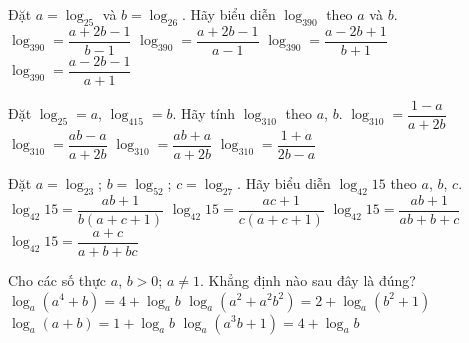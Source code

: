 \begin{ex}%
	Đặt $a=\log_25$ và $b=\log_26$. Hãy biểu diễn $\log_390$ theo $a$ và $b$.
	\choice
	{\True $\log_390=\dfrac{a+2b-1}{b-1}$}
	{$\log_390=\dfrac{a+2b-1}{a-1}$}
	{$\log_390=\dfrac{a-2b+1}{b+1}$}
	{$\log_390=\dfrac{a-2b-1}{a+1}$}
\end{ex}

\begin{ex}%
	Đặt $\log_25=a$, $\log_415=b$. Hãy tính $\log_310$ theo $a$, $b$. 
	\choice
	{$\log_310=\dfrac{1-a}{a+2b}$}
	{$\log_310=\dfrac{ab-a}{a+2b}$}
	{$\log_310=\dfrac{ab+a}{a+2b}$}
	{\True $\log_310=\dfrac{1+a}{2b-a}$}
\end{ex}

\begin{ex}%
	Đặt $a=\log_23$; $b=\log_52$; $c=\log_27$. Hãy biểu diễn $\log_{42}15$ theo $a$, $b$, $c$.
	\choice
	{\True $\log_{42}15=\dfrac{ab+1}{b(a+c+1)}$}
	{$\log_{42}15=\dfrac{ac+1}{c(a+c+1)}$}
	{$\log_{42}15=\dfrac{ab+1}{ab+b+c}$}
	{$\log_{42}15=\dfrac{a+c}{a+b+bc}$}
\end{ex}

\begin{ex}%
	Cho các số thực $a$, $b>0$; $a\neq 1$. Khẳng định nào sau đây là đúng?
	\choice
	{$\log_a\left(a^4+b\right)=4+\log_ab$}
	{\True $\log_a\left(a^2+a^2b^2\right)=2+\log_a\left(b^2+1\right)$}
	{$\log_a(a+b)=1+\log_ab$}
	{$\log_a\left(a^3b+1\right)=4+\log_ab$}
\end{ex}

